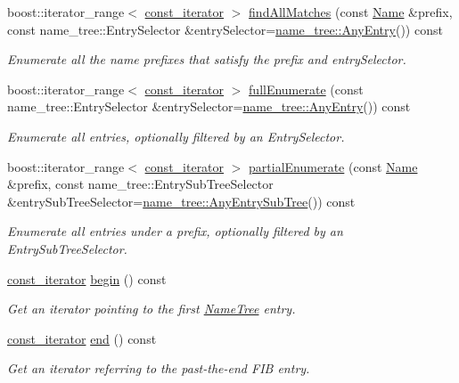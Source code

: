 \begin{DoxyCompactItemize}
\item 
boost\+::iterator\+\_\+range$<$ \hyperlink{classnfd_1_1NameTree_1_1const__iterator}{const\+\_\+iterator} $>$ \hyperlink{classnfd_1_1NameTree_a75fc1eb178c45c28fff7beef6004642a}{find\+All\+Matches} (const \hyperlink{classndn_1_1Name}{Name} \&prefix, const name\+\_\+tree\+::\+Entry\+Selector \&entry\+Selector=\hyperlink{structnfd_1_1name__tree_1_1AnyEntry}{name\+\_\+tree\+::\+Any\+Entry}()) const
\begin{DoxyCompactList}\small\item\em Enumerate all the name prefixes that satisfy the prefix and entry\+Selector. \end{DoxyCompactList}\item 
boost\+::iterator\+\_\+range$<$ \hyperlink{classnfd_1_1NameTree_1_1const__iterator}{const\+\_\+iterator} $>$ \hyperlink{classnfd_1_1NameTree_a16fe7c43112b4a4d4ebcdfe506da1c9f}{full\+Enumerate} (const name\+\_\+tree\+::\+Entry\+Selector \&entry\+Selector=\hyperlink{structnfd_1_1name__tree_1_1AnyEntry}{name\+\_\+tree\+::\+Any\+Entry}()) const
\begin{DoxyCompactList}\small\item\em Enumerate all entries, optionally filtered by an Entry\+Selector. \end{DoxyCompactList}\item 
boost\+::iterator\+\_\+range$<$ \hyperlink{classnfd_1_1NameTree_1_1const__iterator}{const\+\_\+iterator} $>$ \hyperlink{classnfd_1_1NameTree_a96dc37902fe104b08bd8a27f15302acd}{partial\+Enumerate} (const \hyperlink{classndn_1_1Name}{Name} \&prefix, const name\+\_\+tree\+::\+Entry\+Sub\+Tree\+Selector \&entry\+Sub\+Tree\+Selector=\hyperlink{structnfd_1_1name__tree_1_1AnyEntrySubTree}{name\+\_\+tree\+::\+Any\+Entry\+Sub\+Tree}()) const
\begin{DoxyCompactList}\small\item\em Enumerate all entries under a prefix, optionally filtered by an Entry\+Sub\+Tree\+Selector. \end{DoxyCompactList}\item 
\hyperlink{classnfd_1_1NameTree_1_1const__iterator}{const\+\_\+iterator} \hyperlink{classnfd_1_1NameTree_a6e3e53b6941440e161fa77fbf9ac8eb1}{begin} () const
\begin{DoxyCompactList}\small\item\em Get an iterator pointing to the first \hyperlink{classnfd_1_1NameTree}{Name\+Tree} entry. \end{DoxyCompactList}\item 
\hyperlink{classnfd_1_1NameTree_1_1const__iterator}{const\+\_\+iterator} \hyperlink{classnfd_1_1NameTree_a8f1e47eae802d18bbae9882f541f8fb5}{end} () const
\begin{DoxyCompactList}\small\item\em Get an iterator referring to the past-\/the-\/end F\+IB entry. \end{DoxyCompactList}\end{DoxyCompactItemize}


